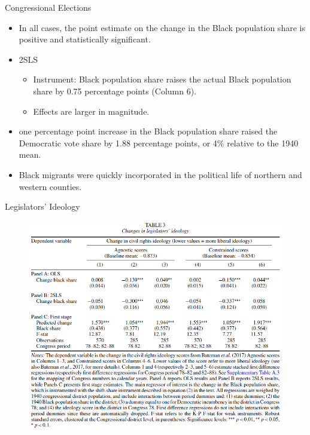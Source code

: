 \documentclass[dvipdfmx,11pt]{beamer}
\begin{document}
\begin{frame}{Congressional Elections}
  \begin{itemize}
    \item In all cases, the point estimate on the change in the Black population share is positive and statistically significant.
    \item 2SLS
    \begin{itemize}
      \item Instrument: Black population share raises the actual Black population share by 0.75 percentage points (Column 6).
      \item Effects are larger in magnitude.
    \end{itemize}
    \item one percentage point increase in the Black population share raised the Democratic vote share by 1.88 percentage points, or 4\% relative to the 1940 mean.
    \item Black migrants were quickly incorporated in the political life of northern and western counties.
  \end{itemize}
\end{frame}

\begin{frame}{Legislators' Ideology}
  \begin{figure}
    \centering
    \includegraphics[scale = .4]{fig_tab/os20220708/T3.png}
  \end{figure}
\end{frame}
\end{document}
